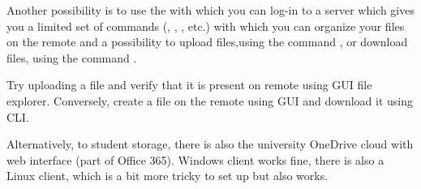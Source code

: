 Another possibility is to use the  with which you can log-in to a server which gives you a limited set of commands (, , ,  etc.) with which you can organize your files on the remote and a possibility to upload files,using the command , or download files, using the command .

\begin{exercise}
    Try uploading a file and verify that it is present on remote using GUI file explorer. Conversely, create a file on the remote using GUI and download it using CLI.
\end{exercise}

Alternatively, to student storage, there is also the university OneDrive cloud with web interface (part of Office 365). Windows client works fine, there is also a Linux client, which is a bit more tricky to set up but also works.